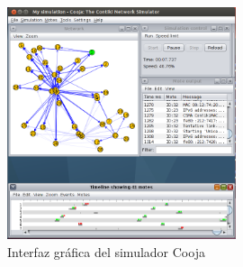 \begin{figure}[ht]
    \centering
    \includegraphics[width=0.6\textwidth]{archivos/img/teoria/cooja.png}
    \caption{Interfaz gráfica del simulador Cooja \cite{cooja1}}
    \label{fig:cooja}
\end{figure}

